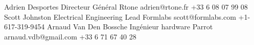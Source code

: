%
%
%


\begin{referees}
		{Adrien Desportes}
		{Directeur Général}
		{Rtone}
		{adrien@rtone.fr}
		{+33 6 08 07 99 08}
		{Scott Johnston}
		{Electrical Engineering Lead}
		{Formlabs}
		{scott@formlabs.com}
		{+1-617-319-9454}
		{Arnaud Van Den Bossche}
		{Ingénieur hardware}
		{Parrot}
		{arnaud.vdb@gmail.com}
		{+33 6 71 67 40 28}
\end{referees}

